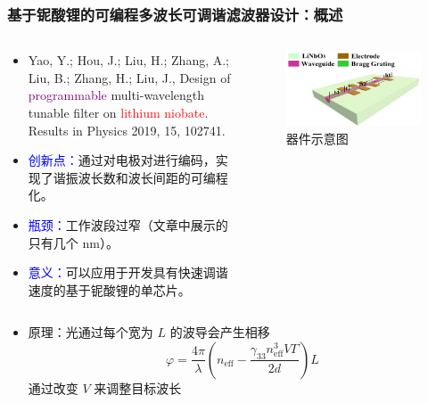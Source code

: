 \begin{frame}[c]
    \frametitle{基于铌酸锂的可编程多波长可调谐滤波器设计：概述}
    \begin{columns}
        \begin{column}{.6\textwidth}
            \begin{itemize}
                \item Yao, Y.;  Hou, J.;  Liu, H.;  Zhang, A.;  Liu, B.;  Zhang, H.; Liu, J., Design of \textcolor{purple}{programmable} multi-wavelength tunable filter on \textcolor{red}{lithium niobate}. Results in Physics 2019, 15, 102741.
                \item \textcolor{blue}{创新点：}通过对电极对进行编码，实现了谐振波长数和波长间距的可编程化。
                \item \textcolor{blue}{瓶颈：}工作波段过窄（文章中展示的只有几个 $\mathrm{nm}$）。
                \item \textcolor{blue}{意义：}可以应用于开发具有快速调谐速度的基于铌酸锂的单芯片。
            \end{itemize}
        \end{column}
        \begin{column}{.4\textwidth}
            \begin{figure}[H] %
                \centering %
                \includegraphics[width=1.\textwidth]{figures/Design of programmable multi-wavelength tunable filter on lithium niobate_1.png} %
                \caption{器件示意图}
            \end{figure}
        \end{column}
    \end{columns}

    \begin{itemize}
        \item 原理：光通过每个宽为 $L$ 的波导会产生相移\[\varphi=\frac{4\pi}{\lambda}(n_{\mathrm{eff}}-\frac{\gamma_{33}n_{\mathrm{eff}}^3V\Gamma}{2d})L\]通过改变 $V$ 来调整目标波长
    \end{itemize}
\end{frame}


